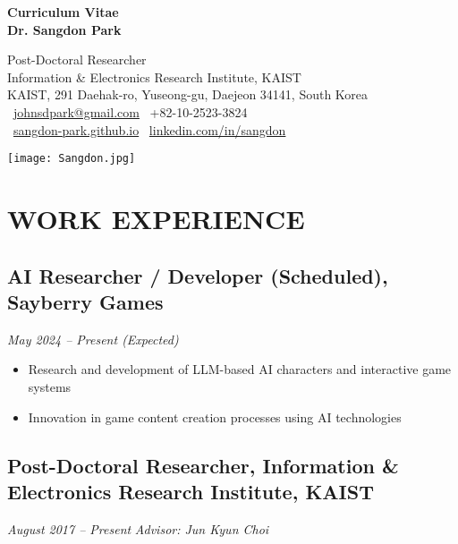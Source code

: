 \documentclass[11pt,a4paper]{article}
\begin{document}
\begin{minipage}[t]{0.69\textwidth}
{\huge\bfseries Curriculum Vitae}\\[0.8cm]
{\Large\bfseries Dr. Sangdon Park}

\vspace{0.3cm}
Post-Doctoral Researcher\\
Information \& Electronics Research Institute, KAIST\\
KAIST, 291 Daehak-ro, Yuseong-gu, Daejeon 34141, South Korea\vspace{0.3cm}\\
\faEnvelope\ \href{mailto:johnsdpark@gmail.com}{johnsdpark@gmail.com} \hfill \faPhone\ +82-10-2523-3824 \\[0.2cm]
\faGlobe\ \href{https://sangdon-park.github.io/}{sangdon-park.github.io} \hfill \faLinkedin\ \href{https://www.linkedin.com/in/sangdon/}{linkedin.com/in/sangdon}
\end{minipage}%
\hfill
\begin{minipage}[t]{0.3\textwidth}
\vspace{-0.3cm}
\begin{flushright}
\texttt{[image: Sangdon.jpg]}
\end{flushright}
\end{minipage}

\vspace{0.3cm}
\linespread{1}
\section{WORK EXPERIENCE}

\subsection*{AI Researcher / Developer (Scheduled), Sayberry Games}
\textit{May 2024 -- Present (Expected)}

\begin{itemize}
    \item Research and development of LLM-based AI characters and interactive game systems
    \item Innovation in game content creation processes using AI technologies
\end{itemize}

\subsection*{Post-Doctoral Researcher, Information \& Electronics Research Institute, KAIST}
\textit{August 2017 -- Present} \hfill \textit{Advisor: Jun Kyun Choi}
\end{document}
